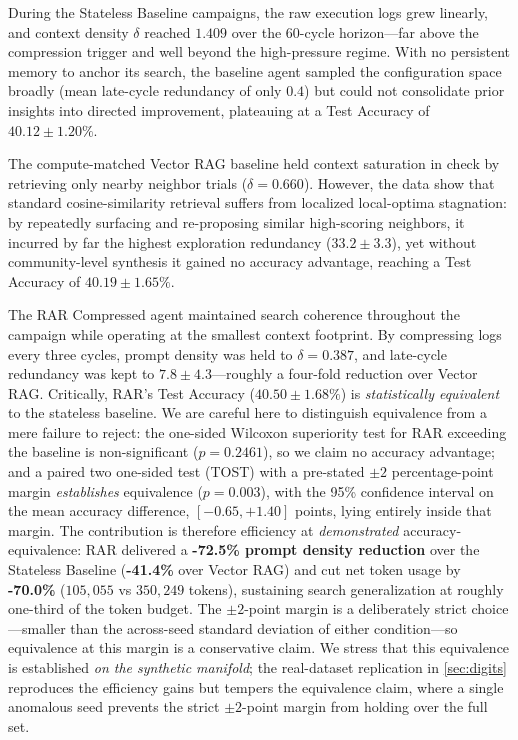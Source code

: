 \documentclass[conference]{IEEEtran}
\begin{document}
During the Stateless Baseline campaigns, the raw execution logs grew linearly, and context density $\delta$ reached $1.409$ over the 60-cycle horizon---far above the compression trigger and well beyond the high-pressure regime. With no persistent memory to anchor its search, the baseline agent sampled the configuration space broadly (mean late-cycle redundancy of only $0.4$) but could not consolidate prior insights into directed improvement, plateauing at a Test Accuracy of $40.12 \pm 1.20\%$.

The compute-matched Vector RAG baseline held context saturation in check by retrieving only nearby neighbor trials ($\delta = 0.660$). However, the data show that standard cosine-similarity retrieval suffers from localized local-optima stagnation: by repeatedly surfacing and re-proposing similar high-scoring neighbors, it incurred by far the highest exploration redundancy ($33.2 \pm 3.3$), yet without community-level synthesis it gained no accuracy advantage, reaching a Test Accuracy of $40.19 \pm 1.65\%$.

The RAR Compressed agent maintained search coherence throughout the campaign while operating at the smallest context footprint. By compressing logs every three cycles, prompt density was held to $\delta = 0.387$, and late-cycle redundancy was kept to $7.8 \pm 4.3$---roughly a four-fold reduction over Vector RAG. Critically, RAR's Test Accuracy ($40.50 \pm 1.68\%$) is \emph{statistically equivalent} to the stateless baseline. We are careful here to distinguish equivalence from a mere failure to reject: the one-sided Wilcoxon superiority test for RAR exceeding the baseline is non-significant ($p = 0.2461$), so we claim no accuracy advantage; and a paired two one-sided test (TOST) with a pre-stated $\pm 2$ percentage-point margin \emph{establishes} equivalence ($p = 0.003$), with the 95\% confidence interval on the mean accuracy difference, $[-0.65, +1.40]$ points, lying entirely inside that margin. The contribution is therefore efficiency at \emph{demonstrated} accuracy-equivalence: RAR delivered a \textbf{-72.5\% prompt density reduction} over the Stateless Baseline (\textbf{-41.4\%} over Vector RAG) and cut net token usage by \textbf{-70.0\%} ($105{,}055$ vs $350{,}249$ tokens), sustaining search generalization at roughly one-third of the token budget. The $\pm 2$-point margin is a deliberately strict choice---smaller than the across-seed standard deviation of either condition---so equivalence at this margin is a conservative claim. We stress that this equivalence is established \emph{on the synthetic manifold}; the real-dataset replication in \cref{sec:digits} reproduces the efficiency gains but tempers the equivalence claim, where a single anomalous seed prevents the strict $\pm 2$-point margin from holding over the full set.
\end{document}
